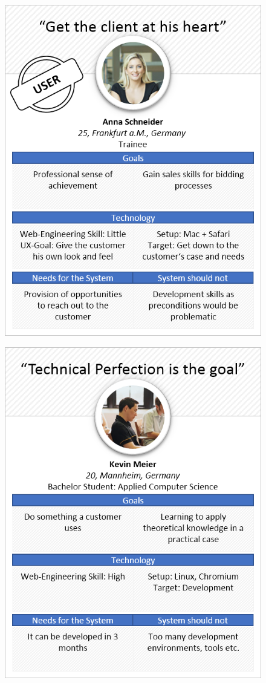 \begin{figure}[H] 
        \centering\includegraphics[width=\textwidth]{img/diagrams/personas/owner2.png}
	\captionsetup{labelformat=empty}
        \caption[]{}
\end{figure}

\begin{figure}[H] 
        \centering\includegraphics[width=\textwidth]{img/diagrams/personas/developer.png}
	\captionsetup{labelformat=empty}
        \caption[]{}
\end{figure}
\label{persend}